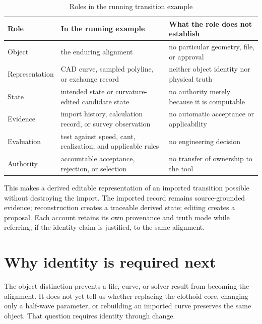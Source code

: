 \begin{table}[htbp]
\centering
\small
\caption{Roles in the running transition example}
\label{tab:meaning-roles}
\begin{tabular}{@{}p{}p{}p{}@{}}
\toprule
Role & In the running example & What the role does not establish \\
\midrule
Object & the enduring alignment & no particular geometry, file, or approval \\
Representation & CAD curve, sampled polyline, or exchange record & neither object identity nor physical truth \\
State & intended state or curvature-edited candidate state & no authority merely because it is computable \\
Evidence & import history, calculation record, or survey observation & no automatic acceptance or applicability \\
Evaluation & test against speed, cant, realization, and applicable rules & no engineering decision \\
Authority & accountable acceptance, rejection, or selection & no transfer of ownership to the tool \\
\bottomrule
\end{tabular}
\end{table}

This makes a derived editable representation of an imported transition
possible without destroying the import. The imported record remains
source-grounded evidence; reconstruction creates a traceable derived state;
editing creates a proposal. Each account retains its own provenance and truth
mode while referring, if the identity claim is justified, to the same
alignment.

\section{Why identity is required next}

The object distinction prevents a file, curve, or solver result from becoming
the alignment. It does not yet tell us whether replacing the clothoid core,
changing only a half-wave parameter, or rebuilding an imported curve preserves
the same object. That question requires identity through change.
